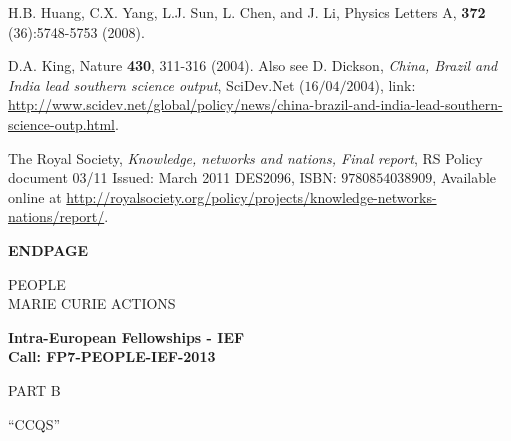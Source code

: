 \documentclass[a4paper,11pt,color]{article}
\def\Acronimo{CCQS}
\renewenvironment{thebibliography}[1]{%
    \begin{oldthebibliography}{#1}%
      \setlength{\parskip}{0ex}%
      \setlength{\itemsep}{0ex}%
  }%
  {%
    \end{oldthebibliography}%
  }
\begin{document}
\begin{thebibliography}{}
H.B. Huang, C.X. Yang, L.J. Sun, L. Chen, and J. Li, Physics Letters A, {\bf 372} (36):5748-5753 (2008).


D.A. King, Nature {\bf 430}, 311-316 (2004). Also see D. Dickson, \textit{China, Brazil and India lead southern science output}, SciDev.Net ($16/04/2004$), link: \url{http://www.scidev.net/global/policy/news/china-brazil-and-india-lead-southern-science-outp.html}.

The Royal Society, \textit{Knowledge, networks and nations, Final report}, RS Policy document 03/11
Issued: March 2011 DES2096, ISBN: $9780854038909$, Available online at \url{http://royalsociety.org/policy/projects/knowledge-networks-nations/report/}.
\end{thebibliography}

\phantom{a}

\newpage
\phantom{a}
\vspace{15mm}
\begin{center}


        \Large{
      
     
        \textbf{ENDPAGE}
  
          \vspace{15mm}
          PEOPLE\\
          MARIE CURIE ACTIONS\\
          \vspace{1cm}
          
          \textbf{Intra-European Fellowships - IEF}\\
          \textbf{Call: FP7-PEOPLE-IEF-2013}
          \vspace{2cm}                   

          PART B
          \vspace{2cm}

          ``\Acronimo{}''
        }

  \end{center}
\vspace{1cm}
\end{document}
